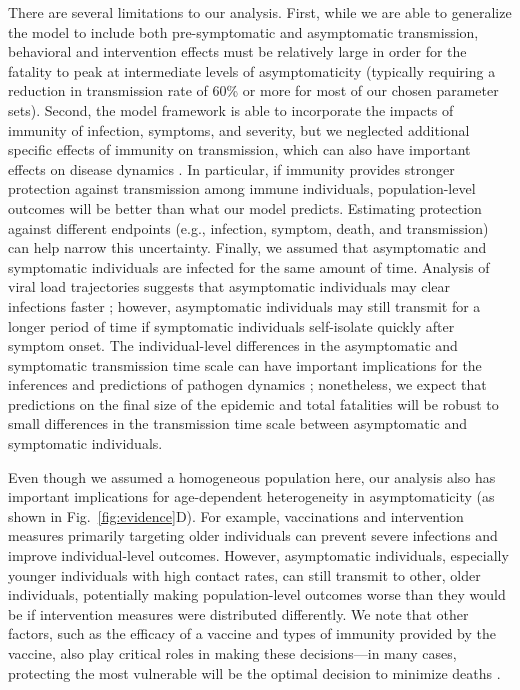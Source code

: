 \documentclass[12pt]{article}
\newcommand{\fref}[1]{Fig.~\ref{fig:#1}}
\begin{document}
There are several limitations to our analysis.
First, while we are able to generalize the model to include both pre-symptomatic and asymptomatic transmission, behavioral and intervention effects must be relatively large in order for the fatality to peak at intermediate levels of asymptomaticity (typically requiring a reduction in transmission rate of 60\% or more for most of our chosen parameter sets).
Second, the model framework is able to incorporate the impacts of immunity of infection, symptoms, and severity,
but we neglected additional specific effects of immunity on transmission, which can also have important effects on disease dynamics \cite{saad2020immune,gallagher2021indirect}.
In particular, if immunity provides stronger protection against transmission among immune individuals, population-level outcomes will be better than what our model predicts.
Estimating protection against different endpoints (e.g., infection, symptom, death, and transmission) can help narrow this uncertainty.
Finally, we assumed that asymptomatic and symptomatic individuals are infected for the same amount of time.
Analysis of viral load trajectories suggests that asymptomatic individuals may clear infections faster \cite{Kissler2020};
however, asymptomatic individuals may still transmit for a longer period of time if symptomatic individuals self-isolate quickly after symptom onset.
The individual-level differences in the asymptomatic and symptomatic transmission time scale can have important implications for the inferences and predictions of pathogen dynamics \cite{park2020time,harris2023time};
nonetheless, we expect that predictions on the final size of the epidemic and total fatalities will be robust to small differences in the transmission time scale between asymptomatic and symptomatic individuals.

Even though we assumed a homogeneous population here, our analysis also has important implications for age-dependent heterogeneity in asymptomaticity (as shown in \fref{evidence}D).
For example, vaccinations and intervention measures primarily targeting older individuals can prevent severe infections and improve individual-level outcomes.
However, asymptomatic individuals, especially younger individuals with high contact rates, can still transmit to other, older individuals, potentially making population-level outcomes worse than they would be if intervention measures were distributed differently.
We note that other factors, such as the efficacy of a vaccine and types of immunity provided by the vaccine, also play critical roles in making these decisions---in many cases, protecting the most vulnerable will be the optimal decision to minimize deaths \cite{moore2021modelling}.
\end{document}

